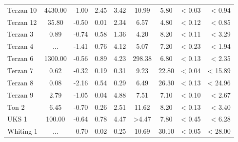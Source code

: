 \documentclass[doublespace,nopageskip]{VTthesis}
\begin{document}
\begin{appendices}
\begin{center}
\begin{longtable}{lcccccccr}
Terzan 10 & 4430.00 & -1.00 & 2.45 & 3.42 & 10.99 & 5.80 & < 0.03 & < 0.94\\
Terzan 12 & 35.80 & -0.50 & 0.01 & 2.34 & 6.57 & 4.80 & < 0.12 & < 0.85\\
Terzan 3 & 0.89 & -0.74 & 0.58 & 1.36 & 4.20 & 8.20 & < 0.11 & < 3.29\\
Terzan 4 & ... & -1.41 & 0.76 & 4.12 & 5.07 & 7.20 & < 0.23 & < 1.94\\
Terzan 6 & 1300.00 & -0.56 & 0.89 & 4.23 & 298.38 & 6.80 & < 0.13 & < 2.35\\
Terzan 7 & 0.62 & -0.32 & 0.19 & 0.31 & 9.23 & 22.80 & < 0.04 & < 15.89\\
Terzan 8 & 0.08 & -2.16 & 0.54 & 0.29 & 6.49 & 26.30 & < 0.13 & < 24.96\\
Terzan 9 & 2.79 & -1.05 & 0.04 & 4.88 & 7.51 & 7.10 & < 0.10 & < 2.67\\
Ton 2 & 6.45 & -0.70 & 0.26 & 2.51 & 11.62 & 8.20 & < 0.13 & < 3.40\\
UKS 1 & 100.00 & -0.64 & 0.78 & 4.47 & >4.47 & 7.80 & < 0.45 & < 6.28\\
Whiting 1 & ... & -0.70 & 0.02 & 0.25 & 10.69 & 30.10 & < 0.05 & < 28.00\\
\end{longtable}
\end{center}


\end{appendices}
\end{document}

